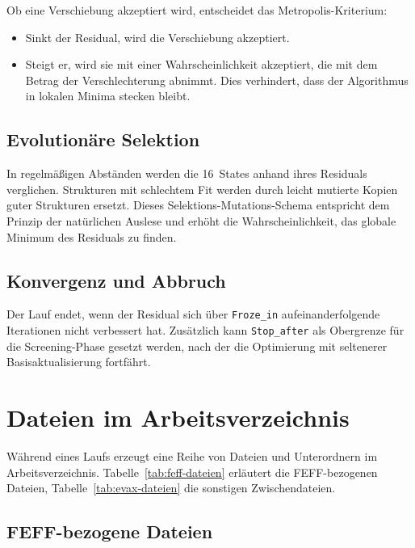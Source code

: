 Ob eine Verschiebung akzeptiert wird, entscheidet das
Metropolis-Kriterium:
\begin{itemize}[nosep]
  \item Sinkt der Residual, wird die Verschiebung akzeptiert.
  \item Steigt er, wird sie mit einer Wahrscheinlichkeit akzeptiert,
        die mit dem Betrag der Verschlechterung abnimmt.
        Dies verhindert, dass der Algorithmus in lokalen Minima
        stecken bleibt.
\end{itemize}

\subsection{Evolutionäre Selektion}

In regelmäßigen Abständen werden die 16~States anhand ihres Residuals
verglichen.
Strukturen mit schlechtem Fit werden durch leicht mutierte Kopien
guter Strukturen ersetzt.
Dieses Selektions-Mutations-Schema entspricht dem Prinzip der
natürlichen Auslese und erhöht die Wahrscheinlichkeit, das globale
Minimum des Residuals zu finden.

\subsection{Konvergenz und Abbruch}

Der Lauf endet, wenn der Residual sich über \texttt{Froze\_in}
aufeinanderfolgende Iterationen nicht verbessert hat.
Zusätzlich kann \texttt{Stop\_after} als Obergrenze für die
Screening-Phase gesetzt werden, nach der die Optimierung mit
seltenerer Basisaktualisierung fortfährt.


\section{Dateien im Arbeitsverzeichnis}

Während eines Laufs erzeugt \evax{} eine Reihe von Dateien und
Unterordnern im Arbeitsverzeichnis.
Tabelle~\ref{tab:feff-dateien} erläutert die FEFF-bezogenen Dateien,
Tabelle~\ref{tab:evax-dateien} die sonstigen Zwischendateien.

\subsection{FEFF-bezogene Dateien}

